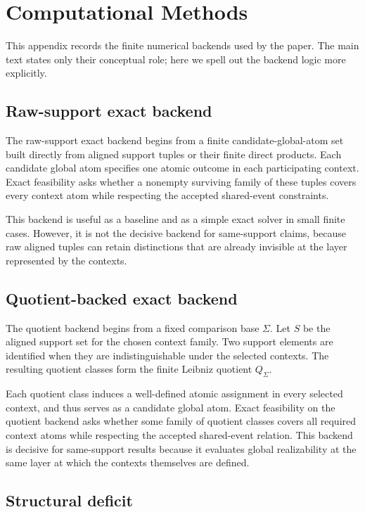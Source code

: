 \documentclass[11pt]{article}
\theoremstyle{definition}
\begin{document}
\section{Computational Methods}\label{app:computational-methods}
This appendix records the finite numerical backends used by the paper. The main text states only their conceptual role; here we spell out the backend logic more explicitly.

\subsection{Raw-support exact backend}

The raw-support exact backend begins from a finite candidate-global-atom set built directly from aligned support tuples or their finite direct products. Each candidate global atom specifies one atomic outcome in each participating context. Exact feasibility asks whether a nonempty surviving family of these tuples covers every context atom while respecting the accepted shared-event constraints.

This backend is useful as a baseline and as a simple exact solver in small finite cases. However, it is not the decisive backend for same-support claims, because raw aligned tuples can retain distinctions that are already invisible at the layer represented by the contexts.

\subsection{Quotient-backed exact backend}

The quotient backend begins from a fixed comparison base \(\Sigma\). Let \(S\) be the aligned support set for the chosen context family. Two support elements are identified when they are indistinguishable under the selected contexts. The resulting quotient classes form the finite Leibniz quotient \(Q_\Sigma\).

Each quotient class induces a well-defined atomic assignment in every selected context, and thus serves as a candidate global atom. Exact feasibility on the quotient backend asks whether some family of quotient classes covers all required context atoms while respecting the accepted shared-event relation. This backend is decisive for same-support results because it evaluates global realizability at the same layer at which the contexts themselves are defined.

\subsection{Structural deficit}
\end{document}
